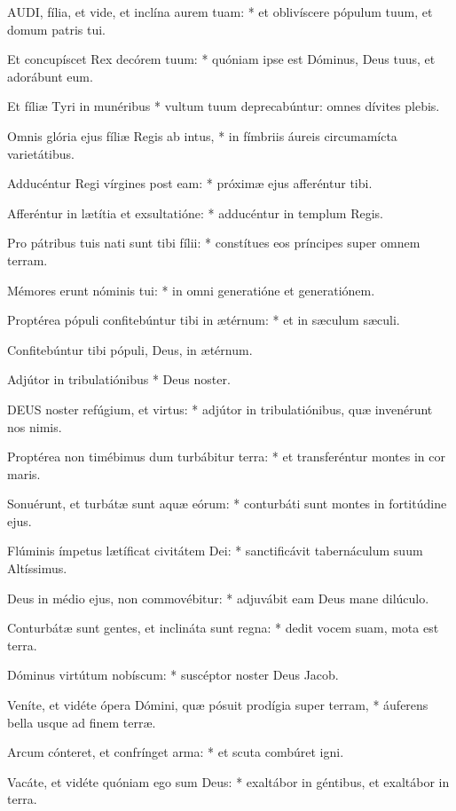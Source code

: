 
\lettrine[lines=2]{A}{UDI}, fília, et vide, et inclína aurem tuam: * et oblivíscere pópulum tuum, et domum patris tui.

Et concupíscet Rex decórem tuum: * quóniam ipse est Dóminus, Deus tuus, et adorábunt eum.

Et fíliæ Tyri in munéribus * vultum tuum deprecabúntur: omnes dívites plebis.

Omnis glória ejus fíliæ Regis ab intus, * in fímbriis áureis circumamícta varietátibus.

Adducéntur Regi vírgines post eam: * próximæ ejus afferéntur tibi.

Afferéntur in lætítia et exsultatióne: * adducéntur in templum Regis.

Pro pátribus tuis nati sunt tibi fílii: * constítues eos príncipes super omnem terram.

Mémores erunt nóminis tui: * in omni generatióne et generatiónem.

Proptérea pópuli confitebúntur tibi in ætérnum: * et in sæculum sæculi.

 Confitebúntur tibi pópuli, Deus, in ætérnum.

 Adjútor in tribulatiónibus * Deus noster.


\lettrine[lines=2]{D}{EUS} noster refúgium, et virtus: * adjútor in tribulatiónibus, quæ invenérunt nos nimis.

Proptérea non timébimus dum turbábitur terra: * et transferéntur montes in cor maris.

Sonuérunt, et turbátæ sunt aquæ eórum: * conturbáti sunt montes in fortitúdine ejus.

Flúminis ímpetus lætíficat civitátem Dei: * sanctificávit tabernáculum suum Altíssimus.

Deus in médio ejus, non commovébitur: * adjuvábit eam Deus mane dilúculo.

Conturbátæ sunt gentes, et inclináta sunt regna: * dedit vocem suam, mota est terra.

Dóminus virtútum nobíscum: * suscéptor noster Deus Jacob.

Veníte, et vidéte ópera Dómini, quæ pósuit prodígia super terram, * áuferens bella usque ad finem terræ.

Arcum cónteret, et confrínget arma: * et scuta combúret igni.

Vacáte, et vidéte quóniam ego sum Deus: * exaltábor in géntibus, et exaltábor in terra.

